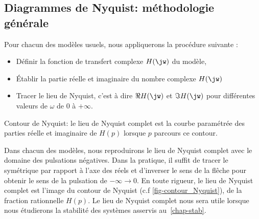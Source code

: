 \subsection{Diagrammes de Nyquist: méthodologie générale}
Pour chacun des modèles usuels, nous appliquerons la procédure suivante :
\begin{itemize}
    \item Définir la fonction de transfert complexe $H(\jw)$ du modèle,
    \item \'Etablir la partie réelle et imaginaire du nombre complexe $H(\jw)$
    \item Tracer le lieu de Nyquist, c'est à dire $\Re{H(\jw)}$ et 
          $\Im{H(\jw)}$ pour différentes valeurs de $\omega$ de 0 à $+\infty$. 
\end{itemize}
\begin{marginfigure}
    \centering
    
    \caption{Contour de Nyquist: le lieu de Nyquist complet est 
             la courbe paramétrée des parties réelle et imaginaire 
             de $H(p)$ lorsque $p$ parcours ce contour.
             \label{fig-contour_Nyquist}}
\end{marginfigure}
Dans chacun des modèles, nous reproduirons le lieu de Nyquist 
complet avec le domaine des pulsations négatives. Dans la pratique, il suffit 
de tracer le symétrique par rapport à 
l'axe des réels et d'inverser le sens de la flêche pour obtenir le sens de la 
pulsation de $-\infty\to 0$. 
En toute rigueur, le lieu de Nyquist complet est l'image du contour de Nyquist
(c.f \cref{fig-contour_Nyquist}), de la fraction rationnelle $H(p)$. 
Le lieu de Nyquist complet nous sera utile lorsque nous étudierons la stabilité
des systèmes asservis au~\cref{chap-stab}.    
